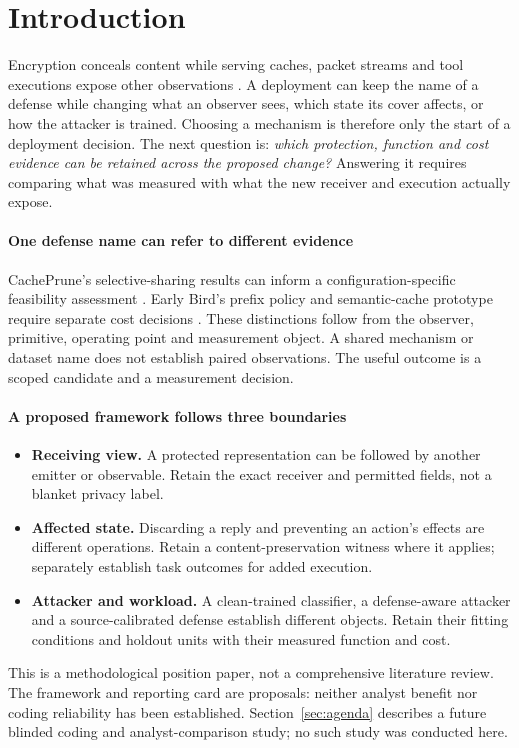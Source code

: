\section{Introduction}\label{sec:introduction}
Encryption conceals content while serving caches, packet streams and tool executions expose other observations \cite{earlybird2025,netecho2025,jeong2026wra}. A deployment can keep the name of a defense while changing what an observer sees, which state its cover affects, or how the attacker is trained. Choosing a mechanism is therefore only the start of a deployment decision. The next question is: \emph{which protection, function and cost evidence can be retained across the proposed change?} Answering it requires comparing what was measured with what the new receiver and execution actually expose.

\paragraph{One defense name can refer to different evidence}
CachePrune's selective-sharing results can inform a configuration-specific feasibility assessment \cite[5.1--5.6]{wu2026cacheprune}. Early Bird's prefix policy and semantic-cache prototype require separate cost decisions \cite[V-A--B]{earlybird2025}. These distinctions follow from the observer, primitive, operating point and measurement object. A shared mechanism or dataset name does not establish paired observations. The useful outcome is a scoped candidate and a measurement decision.

\paragraph{A proposed framework follows three boundaries}
\begin{itemize}
\item \textbf{Receiving view.} A protected representation can be followed by another emitter or observable. Retain the exact receiver and permitted fields, not a blanket privacy label.
\item \textbf{Affected state.} Discarding a reply and preventing an action's effects are different operations. Retain a content-preservation witness where it applies; separately establish task outcomes for added execution.
\item \textbf{Attacker and workload.} A clean-trained classifier, a defense-aware attacker and a source-calibrated defense establish different objects. Retain their fitting conditions and holdout units with their measured function and cost.
\end{itemize}
This is a methodological position paper, not a comprehensive literature review. The framework and reporting card are proposals: neither analyst benefit nor coding reliability has been established. Section~\ref{sec:agenda} describes a future blinded coding and analyst-comparison study; no such study was conducted here.

